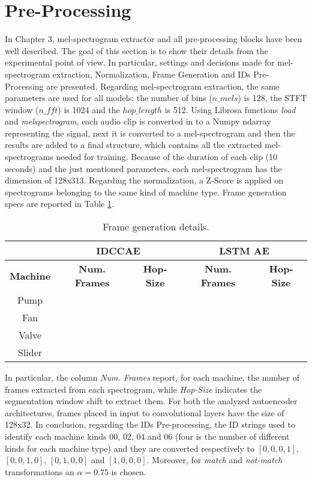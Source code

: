 \section{Pre-Processing}
In Chapter 3, mel-spectrogram extractor and all pre-processing blocks have been well described. The goal of this section is to show their details from the experimental point of view. In particular, settings and decisions made for mel-spectrogram extraction, Normalization, Frame Generation and IDs Pre-Processing are presented. Regarding mel-spectrogram extraction, the same parameters are used for all models: the number of bins ($n\_mels$) is 128, the STFT window ($n\_fft$) is 1024 and the $hop\_length$ is 512. Using Librosa functions \textit{load} and \textit{melspectrogram}, each audio clip is converted in to a Numpy ndarray representing the signal, next it is converted to a mel-spectrogram and then the results are added to a final structure, which contains all the extracted mel-spectrograms needed for training. Because of the duration of each clip (10 seconds) and the just mentioned parameters, each mel-spectrogram has the dimension of 128x313. Regarding the normalization, a Z-Score is applied on spectrograms belonging to the same kind of machine type. Frame generation specs are reported in Table \ref{frame-generation}.
\begin{table}
\centering
\begin{tabular}{|c|c|c|c|c|} 
\cline{2-5}
\multicolumn{1}{c|}{} & \multicolumn{2}{c|}{\textbf{IDCCAE}} & \multicolumn{2}{c|}{\textbf{LSTM AE}} \\ 
\hline
\textbf{Machine} & \textbf{Num. Frames} & \textbf{Hop-Size} & \textbf{Num. Frames} & \textbf{Hop-Size} \\ 
\hline
Pump &  &  &  &  \\ 
\hline
Fan &  &  &  &  \\ 
\hline
Valve &  &  &  &  \\ 
\hline
Slider &  &  &  &  \\
\hline
\end{tabular}
\caption{Frame generation details.}
\label{frame-generation}
\end{table}
In particular, the column \textit{Num. Frames} report, for each machine, the number of frames extracted from each spectrogram, while \textit{Hop-Size} indicates the segmentation window shift to extract them. For both the analyzed autoencoder architectures, frames placed in input to convolutional layers have the size of 128x32. In conclusion, regarding the IDs Pre-processing, the ID strings used to identify each machine kinds $00$, $02$, $04$ and $06$ (four is the number of different kinds for each machine type) and they are converted respectively to $[0,0,0,1]$, $[0,0,1,0]$, $[0,1,0,0]$ and $[1,0,0,0]$. Moreover, for \textit{match} and \textit{not-match} transformations an $\alpha=0.75$ is chosen. 
